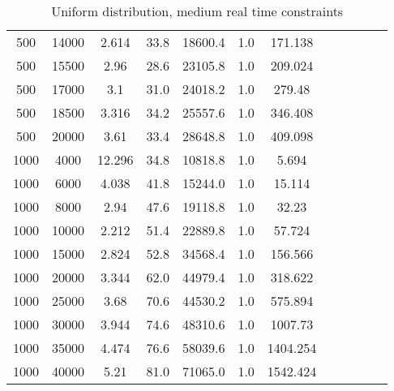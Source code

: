 \begin{table}[htb]
\begin{tabular}{|c|c|c|c|c|c|c|c|c|c|c|c|}
		500 & 14000 & 2.614 & 33.8 & 18600.4 & 1.0 & 171.138 & & & & &  \\ 
		500 & 15500 & 2.96 & 28.6 & 23105.8 & 1.0 & 209.024 & & & & &  \\ 
		500 & 17000 & 3.1 & 31.0 & 24018.2 & 1.0 & 279.48 & & & & &  \\ 
		500 & 18500 & 3.316 & 34.2 & 25557.6 & 1.0 & 346.408 & & & & &  \\ 
		500 & 20000 & 3.61 & 33.4 & 28648.8 & 1.0 & 409.098 & & & & &  \\ 
		1000 & 4000 & 12.296 & 34.8 & 10818.8 & 1.0 & 5.694 & & & & &  \\ 
		1000 & 6000 & 4.038 & 41.8 & 15244.0 & 1.0 & 15.114 & & & & &  \\ 
		1000 & 8000 & 2.94 & 47.6 & 19118.8 & 1.0 & 32.23 & & & & &  \\ 
		1000 & 10000 & 2.212 & 51.4 & 22889.8 & 1.0 & 57.724 & & & & &  \\ 
		1000 & 15000 & 2.824 & 52.8 & 34568.4 & 1.0 & 156.566 & & & & &  \\ 
		1000 & 20000 & 3.344 & 62.0 & 44979.4 & 1.0 & 318.622 & & & & &  \\ 
		1000 & 25000 & 3.68 & 70.6 & 44530.2 & 1.0 & 575.894 & & & & &  \\ 
		1000 & 30000 & 3.944 & 74.6 & 48310.6 & 1.0 & 1007.73 & & & & &  \\ 
		1000 & 35000 & 4.474 & 76.6 & 58039.6 & 1.0 & 1404.254 & & & & &  \\ 
		1000 & 40000 & 5.21 & 81.0 & 71065.0 & 1.0 & 1542.424 & & & & &  \\ 
		\hline 
	\end{tabular} 
	\caption{Uniform distribution, medium real time constraints} 
	\label{tab:unif_m} 
\end{table} 

